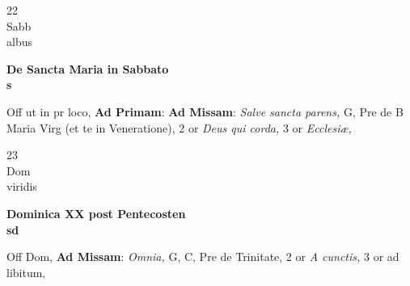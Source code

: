 \documentclass[10pt, openany]{book}
\begin{document}
        \begin{center}
            \begin{minipage}{3.5in}
                \vspace{2em}
                \begin{minipage}{0.5in}
                    {\Huge 22} \\
                    {\normalsize Sabb} \\
                    {\normalsize albus}
                \end{minipage}
                \begin{minipage}{3.0in}
                    \textbf{ \large De Sancta Maria in Sabbato \\
                    \textnormal{\normalsize s}} \\ 
                \end{minipage}
                \begin{justify}Off ut in pr loco, \textbf{Ad Primam}: \textbf{Ad Missam}: \textit{Salve sancta parens,} G, Pre de B Maria Virg (et te in Veneratione), 2 or \textit{Deus qui corda,} 3 or \textit{Ecclesiæ,}  
                \end{justify}
            \end{minipage}
        \end{center}
    
        \begin{center}
            \begin{minipage}{3.5in}
                \vspace{2em}
                \begin{minipage}{0.5in}
                    {\Huge 23} \\
                    {\normalsize Dom} \\
                    {\normalsize viridis}
                \end{minipage}
                \begin{minipage}{3.0in}
                    \textbf{ \large Dominica XX post Pentecosten \\
                    \textnormal{\normalsize sd}} \\ 
                \end{minipage}
                \begin{justify}Off Dom, \textbf{Ad Missam}: \textit{Omnia,} G, C, Pre de Trinitate, 2 or \textit{A cunctis,} 3 or ad libitum,  
                \end{justify}
            \end{minipage}
        \end{center}
    
\end{document}
